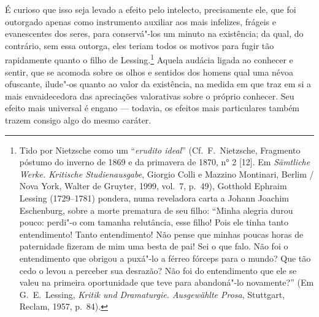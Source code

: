 É curioso que isso seja levado a efeito pelo intelecto, precisamente
ele, que foi outorgado apenas como instrumento auxiliar aos mais
infelizes, frágeis e evanescentes dos seres, para conservá"-los um
minuto na existência; da qual, do contrário, sem essa outorga, eles
teriam todos os motivos para fugir tão rapidamente quanto o filho de
Lessing.\footnote{ Tido por Nietzsche como um “\textit{erudito ideal}”
(Cf.~F.~Nietzsche, Fragmento póstumo do inverno de 1869 e da primavera
de 1870, n° 2 [12]. Em \textit{Sämtliche Werke. Kritische
Studienausgabe}, Giorgio Colli e Mazzino Montinari, Berlim / Nova
York, Walter de Gruyter, 1999, vol.~7, p.~49), Gotthold Ephraim Lessing
(1729--1781) pondera, numa reveladora carta a Johann Joachim
Eschenburg, sobre a morte prematura de seu filho: “Minha alegria durou
pouco: perdi"-o com tamanha relutância, esse filho! Pois ele tinha
tanto entendimento! Tanto entendimento! Não pense que minhas poucas
horas de paternidade fizeram de mim uma besta de pai! Sei o que falo.
Não foi o entendimento que obrigou a puxá"-lo a férreo fórceps
para o mundo? Que tão cedo o levou a perceber sua desrazão? Não foi do
entendimento que ele se valeu na primeira oportunidade que teve para
abandoná"-lo novamente?” (Em G.~E.~Lessing, \textit{Kritik und
Dramaturgie. Ausgewählte Prosa}, Stuttgart, Reclam, 1957, p.~84).}
Aquela audácia ligada ao conhecer e sentir, que se acomoda sobre os
olhos e sentidos dos homens qual uma névoa ofuscante, ilude"-os quanto
ao valor da existência, na medida em que traz em si a mais
envaidecedora das apreciações valorativas sobre o próprio conhecer. Seu
efeito mais universal é engano --- todavia, os efeitos mais particulares
também trazem consigo algo do mesmo caráter.

